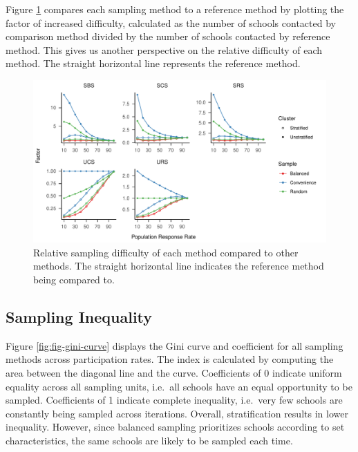 \documentclass[
  english,
  man,floatsintext]{apa6}
\begin{document}
Figure \ref{fig:fig-rel-per} compares each sampling method to a reference method by plotting the factor of increased difficulty, calculated as the number of schools contacted by comparison method divided by the number of schools contacted by reference method. This gives us another perspective on the relative difficulty of each method. The straight horizontal line represents the reference method.



\begin{figure}
\centering
\includegraphics{6---Paper_files/figure-latex/fig-rel-per-1.pdf}
\caption{\label{fig:fig-rel-per}Relative sampling difficulty of each method compared to other methods. The straight horizontal line indicates the reference method being compared to.}
\end{figure}

\newpage

\hypertarget{sampling-inequality}{%
\subsection{Sampling Inequality}\label{sampling-inequality}}

Figure \ref{fig:fig-gini-curve} displays the Gini curve and coefficient for all sampling methods across participation rates. The index is calculated by computing the area between the diagonal line and the curve. Coefficients of 0 indicate uniform equality across all sampling units, i.e.~all schools have an equal opportunity to be sampled. Coefficients of 1 indicate complete inequality, i.e.~very few schools are constantly being sampled across iterations. Overall, stratification results in lower inequality. However, since balanced sampling prioritizes schools according to set characteristics, the same schools are likely to be sampled each time.
\end{document}
